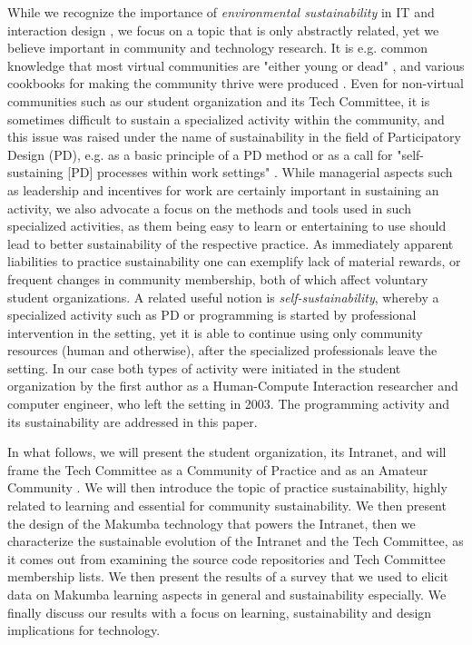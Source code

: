 \documentclass{sig-alt-release2}
\begin{document}
While we recognize the importance of {\it environmental sustainability} in IT and interaction design \cite{blevis07}, we focus on a topic that is only abstractly related, yet we believe important in community and technology research. It is e.g. common knowledge that most virtual communities are "either young or dead" \cite{pargman05}, and various cookbooks for making the community thrive were produced \cite{goodwin94}. Even for non-virtual communities such as our student organization and its Tech Committee, it is sometimes difficult to sustain a specialized activity within the community, and this issue was raised under the name of sustainability in the field of Participatory Design (PD), e.g. as a basic principle of a PD method \cite{kensing98} or as a call for "self-sustaining [PD] processes within work settings" \cite{clement93}.  While managerial aspects such as leadership and incentives for work are certainly important in sustaining an activity, we also advocate a focus on the methods and tools used in such specialized activities, as them being easy to learn or entertaining to use should lead to better sustainability of the respective practice. As immediately apparent liabilities to practice sustainability one can exemplify lack of material rewards, or frequent changes in community membership, both of which affect voluntary student organizations. A related useful notion is {\it self-sustainability}, whereby a specialized activity such as PD \cite{clement93} or programming is started by professional intervention in the setting, yet it is able to continue using only community resources (human and otherwise), after the specialized professionals leave the setting. In our case both types of activity were initiated in the student organization  by the first author as a Human-Compute Interaction researcher and computer engineer, who left the setting in 2003. The programming activity and its sustainability are addressed in this paper.

In what follows, we will present the student organization, its Intranet, and will frame the Tech Committee as a Community of Practice \cite{lave_wenger91, wenger98} and as an Amateur Community \cite{bogdan03, bogdan_bowers07}. We will then introduce the topic of practice sustainability, highly related to learning and essential for community sustainability. We then present the design of the Makumba technology that powers the Intranet, then we characterize the sustainable evolution of the Intranet and the Tech Committee, as it comes out from examining the source code repositories and Tech Committee membership lists. We then present the results of a survey
that we used to elicit data on Makumba learning aspects in general and sustainability especially. We finally discuss our results with a focus on learning, sustainability and design implications for technology.
\end{document}
